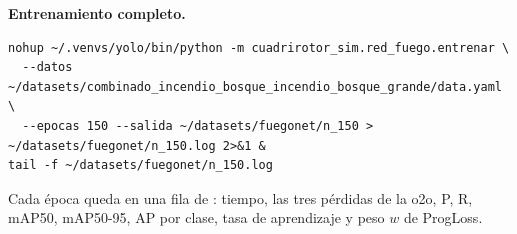  \textbf{Entrenamiento completo.}
\begin{lstlisting}[style=bash]
nohup ~/.venvs/yolo/bin/python -m cuadrirotor_sim.red_fuego.entrenar \
  --datos ~/datasets/combinado_incendio_bosque_incendio_bosque_grande/data.yaml \
  --epocas 150 --salida ~/datasets/fuegonet/n_150 > ~/datasets/fuegonet/n_150.log 2>&1 &
tail -f ~/datasets/fuegonet/n_150.log
\end{lstlisting}
Cada época queda en una fila de : tiempo, las tres pérdidas
de la o2o, P, R, mAP50, mAP50-95, AP por clase, tasa de aprendizaje y peso $w$
de ProgLoss.


